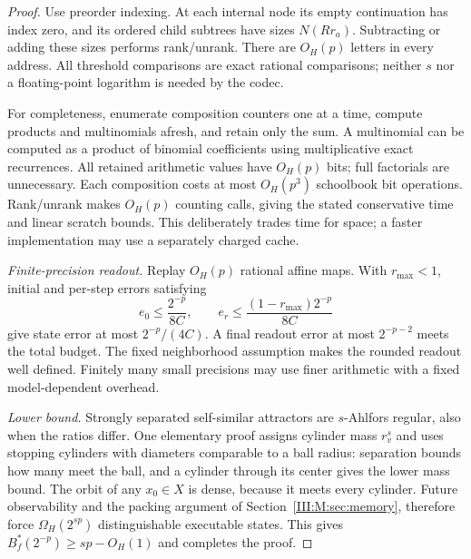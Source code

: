 \begin{proof}
Use preorder indexing. At each internal node its empty continuation has
index zero, and its ordered child subtrees have sizes $N(Rr_a)$.
Subtracting or adding these sizes performs rank/unrank. There are $O_H(p)$
letters in every address. All threshold comparisons are exact rational
comparisons; neither $s$ nor a floating-point logarithm is needed by the codec.

For completeness, enumerate composition counters one at a time, compute
products and multinomials afresh, and retain only the sum. A multinomial can
be computed as a product of binomial coefficients using multiplicative exact
recurrences. All retained arithmetic values have $O_H(p)$ bits; full factorials
are unnecessary. Each composition costs at most $O_H(p^3)$ schoolbook bit
operations. Rank/unrank makes $O_H(p)$ counting calls, giving the stated
conservative time and linear scratch bounds. This deliberately trades time
for space; a faster implementation may use a separately charged cache.

\emph{Finite-precision readout.}
Replay $O_H(p)$ rational affine maps. With $r_{\max}<1$, initial and per-step
errors satisfying
\[
 e_0\le\frac{2^{-p}}{8C},\qquad
 e_r\le\frac{(1-r_{\max})2^{-p}}{8C}
\]
give state error at most $2^{-p}/(4C)$. A final readout error at most
$2^{-p-2}$ meets the total budget. The fixed neighborhood assumption makes
the rounded readout well defined. Finitely many small precisions may use
finer arithmetic with a fixed model-dependent overhead.

\emph{Lower bound.}
Strongly separated self-similar attractors are $s$-Ahlfors regular, also when
the ratios differ. One elementary proof assigns cylinder mass $r_v^s$ and
uses stopping cylinders with diameters comparable to a ball radius: separation
bounds how many meet the ball, and a cylinder through its center gives the
lower mass bound. The orbit of any $x_0\in X$ is dense, because it meets every
cylinder. Future observability and the packing argument of Section~\ref{III:M:sec:memory},
therefore force $\Omega_H(2^{sp})$ distinguishable executable states.
This gives $B_f^*(2^{-p})\ge sp-O_H(1)$ and completes the proof.
\end{proof}
